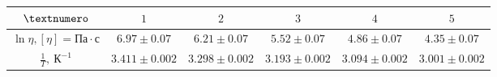 \begin{tabular}{|c|c|c|c|c|c|}
  \hline
  $\textnumero$ & $1$ & $2$ & $3$ & $4$ & $5$\\ \hline
  $\ln{\eta}, [\eta] = Па \cdot с$ & $6.97 \pm 0.07$ & $6.21 \pm 0.07$ & $5.52 \pm 0.07$ & $4.86 \pm 0.07$ & $4.35 \pm 0.07$\\ \hline
  $\frac{1}{T},\ К^{-1}$ & $3.411 \pm 0.002$ & $3.298 \pm 0.002$ & $3.193 \pm 0.002$ & $3.094 \pm 0.002$ & $3.001 \pm 0.002$\\ \hline
 
\end{tabular}